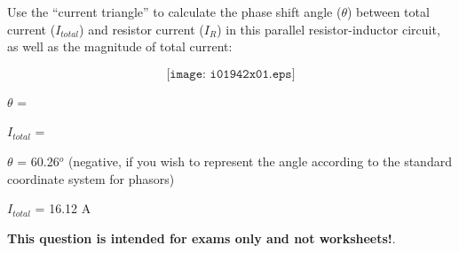 

Use the ``current triangle'' to calculate the phase shift angle ($\theta$) between total current ($I_{total}$) and resistor current ($I_R$) in this parallel resistor-inductor circuit, as well as the magnitude of total current:

$$\texttt{[image: i01942x01.eps]}$$

\vskip 20pt

$\theta$ = 

\vskip 10pt

$I_{total}$ = 







$\theta$ = 60.26$^{o}$ (negative, if you wish to represent the angle according to the standard coordinate system for phasors)

\vskip 10pt

$I_{total}$ = 16.12 A







{\bf This question is intended for exams only and not worksheets!}.




